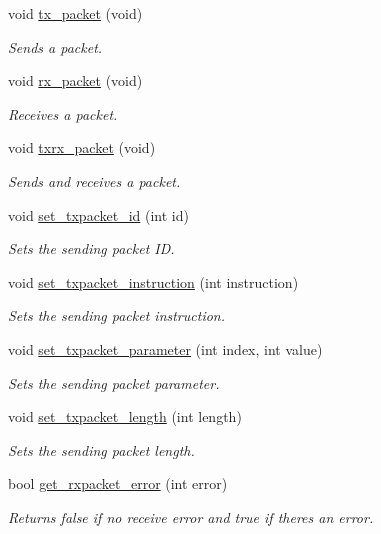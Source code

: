 \begin{DoxyCompactItemize}
void \hyperlink{a00004_a479187cd8940c16dd4374eb5be22b888}{tx\+\_\+packet} (void)
\begin{DoxyCompactList}\small\item\em Sends a packet. \end{DoxyCompactList}\item 
void \hyperlink{a00004_aa26d2d2dff768563a1cb1480aa061608}{rx\+\_\+packet} (void)
\begin{DoxyCompactList}\small\item\em Receives a packet. \end{DoxyCompactList}\item 
void \hyperlink{a00004_aebfc569c6b1eb0b98f8c385f0f921fc0}{txrx\+\_\+packet} (void)
\begin{DoxyCompactList}\small\item\em Sends and receives a packet. \end{DoxyCompactList}\item 
void \hyperlink{a00004_a84e24c72c3e5be866f8b28c2e5bd1d95}{set\+\_\+txpacket\+\_\+id} (int id)
\begin{DoxyCompactList}\small\item\em Sets the sending packet I\+D. \end{DoxyCompactList}\item 
void \hyperlink{a00004_a209a43f983f214323b6f0a627d5e8c13}{set\+\_\+txpacket\+\_\+instruction} (int instruction)
\begin{DoxyCompactList}\small\item\em Sets the sending packet instruction. \end{DoxyCompactList}\item 
void \hyperlink{a00004_a2c3d31bbbed70a69918e9972a620384b}{set\+\_\+txpacket\+\_\+parameter} (int index, int value)
\begin{DoxyCompactList}\small\item\em Sets the sending packet parameter. \end{DoxyCompactList}\item 
void \hyperlink{a00004_a829278f48e21c810b172eb8cab3b86de}{set\+\_\+txpacket\+\_\+length} (int length)
\begin{DoxyCompactList}\small\item\em Sets the sending packet length. \end{DoxyCompactList}\item 
bool \hyperlink{a00004_a843b0aac721e4264e7e3097f80980243}{get\+\_\+rxpacket\+\_\+error} (int error)
\begin{DoxyCompactList}\small\item\em Returns false if no receive error and true if there\textquotesingle{}s an error. \end{DoxyCompactList}\item 

\end{DoxyCompactItemize}
